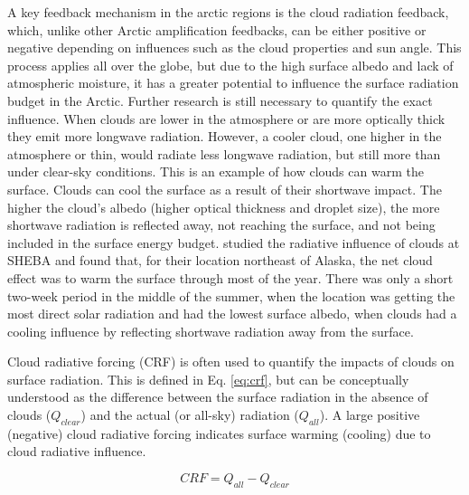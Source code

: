 A key feedback mechanism in the arctic regions is the cloud radiation feedback, which, unlike other Arctic amplification feedbacks, can be either positive or negative depending on influences such as the cloud properties and sun angle. This process applies all over the globe, but due to the high surface albedo and lack of atmospheric moisture, it has a greater potential to influence the surface radiation budget in the Arctic. Further research is still necessary to quantify the exact influence. When clouds are lower in the atmosphere or are more optically thick they emit more longwave radiation. However, a cooler cloud, one higher in the atmosphere or thin, would radiate less longwave radiation, but still more than under clear-sky conditions. This is an example of how clouds can warm the surface. Clouds can cool the surface as a result of their shortwave impact. The higher the cloud's albedo (higher optical thickness and droplet size), the more shortwave radiation is reflected away, not reaching the surface, and not being included in the surface energy budget. \citet{intrieri:2002} studied the radiative influence of clouds at SHEBA and found that, for their location northeast of Alaska, the net cloud effect was to warm the surface through most of the year. There was only a short two-week period in the middle of the summer, when the location was getting the most direct solar radiation and had the lowest surface albedo, when clouds had a cooling influence by reflecting shortwave radiation away from the surface. 

Cloud radiative forcing (CRF) is often used to quantify the impacts of clouds on surface radiation. This is defined in Eq. \ref{eq:crf}, but can be conceptually understood as the difference between the surface radiation in the absence of clouds ($Q_{clear}$) and the actual (or all-sky) radiation ($Q_{all}$). A large positive (negative) cloud radiative forcing indicates surface warming (cooling) due to cloud radiative influence. 

\begin{equation}\label{eq:crf}
CRF = Q_{all} - Q_{clear} 
\end{equation}

